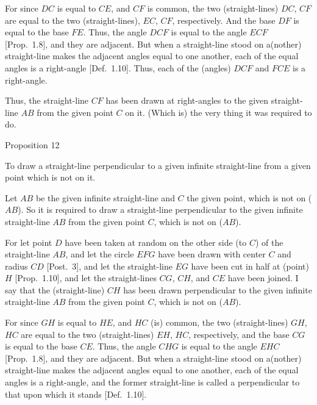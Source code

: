 For since $DC$ is equal to $CE$, and $CF$ is common, the two (straight-lines) $DC$, $CF$
are equal to the two (straight-lines), $EC$, $CF$, respectively.  And the base $DF$
is equal to the base $FE$. Thus, the angle $DCF$ is equal to the
angle $ECF$ [Prop.~1.8], and they are adjacent. But when a straight-line stood on 
a(nother) straight-line makes the adjacent angles equal to one another, each of the
equal angles is a right-angle [Def.~1.10]. Thus, each of the (angles)
$DCF$ and $FCE$ is a right-angle.

Thus, the straight-line $CF$ has been drawn at right-angles to the
given straight-line $AB$ from the given point $C$ on it. (Which is) the very thing
it was required to do.


\begin{center}
{\large Proposition 12}
\end{center}

To draw a straight-line perpendicular to a given infinite straight-line from a given point which is not
on it.\\

\epsfysize=2.2in
\centerline{}

Let $AB$ be the given infinite straight-line  and $C$ the given point, which is not
on ($AB$). So it is required to draw a  straight-line  perpendicular to the
given infinite straight-line $AB$ from the given point $C$, which is not on
($AB$).

For let point $D$ have been taken at random on the other side (to $C$) of 
the straight-line $AB$, and let the circle $EFG$ have been drawn
with center $C$ and radius $CD$ [Post.~3], and let the straight-line $EG$ have been cut
in half at (point) $H$ [Prop.~1.10], and let the straight-lines $CG$, $CH$,
and $CE$ have been joined. I say that the  (straight-line) $CH$ has
been drawn  perpendicular to the given infinite straight-line
$AB$ from the given point $C$, which is not on ($AB$).

For since $GH$ is equal to $HE$, and $HC$ (is) common, the two (straight-lines) $GH$, 
$HC$
are equal to the two (straight-lines) $EH$, $HC$, respectively, and the base $CG$ is
equal to the base $CE$. Thus, the angle $CHG$ is equal to the
angle $EHC$ [Prop.~1.8], and they are adjacent. But when a straight-line
stood on a(nother) straight-line makes the adjacent angles equal to one another, each of the equal angles is a right-angle, and the former straight-line is called a perpendicular to that upon which it stands [Def.~1.10].

